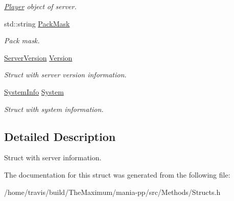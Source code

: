 \begin{DoxyCompactItemize}
\begin{DoxyCompactList}\small\item\em \hyperlink{structPlayer}{Player} object of server. \end{DoxyCompactList}\item 
\hypertarget{structServerInfo_a3b31d3c315156f16d54650a99661ed0f}{std\-::string \hyperlink{structServerInfo_a3b31d3c315156f16d54650a99661ed0f}{Pack\-Mask}}\label{structServerInfo_a3b31d3c315156f16d54650a99661ed0f}

\begin{DoxyCompactList}\small\item\em Pack mask. \end{DoxyCompactList}\item 
\hypertarget{structServerInfo_acf8188cc44967ffa44dc23e14dfe0cd7}{\hyperlink{structServerVersion}{Server\-Version} \hyperlink{structServerInfo_acf8188cc44967ffa44dc23e14dfe0cd7}{Version}}\label{structServerInfo_acf8188cc44967ffa44dc23e14dfe0cd7}

\begin{DoxyCompactList}\small\item\em Struct with server version information. \end{DoxyCompactList}\item 
\hypertarget{structServerInfo_a97727217c6b07430e5d377668567f623}{\hyperlink{structSystemInfo}{System\-Info} \hyperlink{structServerInfo_a97727217c6b07430e5d377668567f623}{System}}\label{structServerInfo_a97727217c6b07430e5d377668567f623}

\begin{DoxyCompactList}\small\item\em Struct with system information. \end{DoxyCompactList}\end{DoxyCompactItemize}


\subsection{Detailed Description}
Struct with server information. 

The documentation for this struct was generated from the following file\-:\begin{DoxyCompactItemize}
\item 
/home/travis/build/\-The\-Maximum/mania-\/pp/src/\-Methods/Structs.\-h\end{DoxyCompactItemize}
